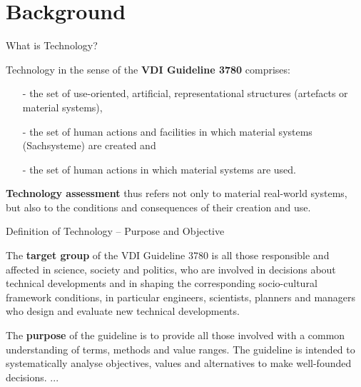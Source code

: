 \documentclass{beamer}
\title{Modelling Sustainable Systems\\ and Semantic Web\\[6pt] Technology
  \vskip1em}
\subtitle{Lecture in the Module 10-202-2309\\ for Master Computer Science}
\author{Prof. Dr. Hans-Gert Gräbe\\
\url{http://www.informatik.uni-leipzig.de/~graebe}}
\date{April 2021}
\begin{document}
{
\begin{frame}
  \titlepage
\end{frame}}

\section{Background}
\begin{frame}{What is Technology?}

Technology in the sense of the \textbf{VDI Guideline 3780} comprises:
\begin{itemize}
\item[-] the set of use-oriented, artificial, representational structures
  (artefacts or material systems),
\item[-] the set of human actions and facilities in which material systems
  (Sachsysteme) are created and
\item[-] the set of human actions in which material systems are used.
\end{itemize}

  \textbf{Technology assessment} thus refers not only to material real-world
  systems, but also to the conditions and consequences of their creation and
  use.
\end{frame}

\begin{frame}{Definition of Technology -- Purpose and Objective}

The \textbf{target group} of the VDI Guideline 3780 is all those responsible
and affected in science, society and politics, who are involved in decisions
about technical developments and in shaping the corresponding socio-cultural
framework conditions, in particular engineers, scientists, planners and
managers who design and evaluate new technical developments.

The \textbf{purpose} of the guideline is to provide all those involved with a
common understanding of terms, methods and value ranges. The guideline is
intended to systematically analyse objectives, values and alternatives to make
well-founded decisions. ...

\end{frame}
\end{document}
